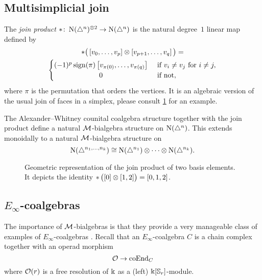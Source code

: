 \subsection{Multisimplicial join}

The \textit{join product} $\ast \colon \operatorname{N}(\triangle^n)^{\otimes 2} \to \operatorname{N}(\triangle^n)$ is the natural degree~$1$ linear map defined by
\begin{multline}
\ast \big(\left[v_0, \dots, v_p \right] \ot \left[v_{p+1}, \dots, v_q\right]\big) = \\
\begin{cases} (-1)^{p} \sign(\pi) \left[v_{\pi(0)}, \dots, v_{\pi(q)}\right] & \text{ if } v_i \neq v_j \text{ for } i \neq j, \\
\hfil 0 & \text{ if not}, \end{cases}
\end{multline}
where $\pi$ is the permutation that orders the vertices.
It is an algebraic version of the usual join of faces in a simplex, please consult \cref{f:join of faces} for an example.

The Alexander--Whitney counital coalgebra structure together with the join product define a natural $\mathcal{M}$-bialgebra structure on $\operatorname{N}(\triangle^n)$. This extends monoidally to a natural $\mathcal{M}$-bialgebra structure on
\[
\operatorname{N}(\triangle^{n_1, \dots, n_k}) \cong
\operatorname{N}(\triangle^{n_1}) \otimes \dotsb \otimes \operatorname{N}(\triangle^{n_k}).
\]

\begin{figure}
	
	\caption{Geometric representation of the join product of two basis elements. It depicts the identity $\operatorname{\ast} \big( [0] \otimes [1,2] \big) = [0,1,2]$.}
	\label{f:join of faces}
\end{figure}

\subsection{\texorpdfstring{${E_\infty}$}{E-infty}-coalgebras}

The importance of $\mathcal{M}$-bialgebras is that they provide a very manageable class of examples of $E_\infty$-coalgebras \cite{medina2020prop1}.
Recall that an $E_\infty$-coalgebra $C$ is a chain complex together with an operad morphism
\[
\mathcal{O} \to \mathrm{coEnd}_C
\]
where $\mathcal{O}(r)$ is a free resolution of $\Bbbk$ as a (left) $\Bbbk[\mathbb{S}_r]$-module.